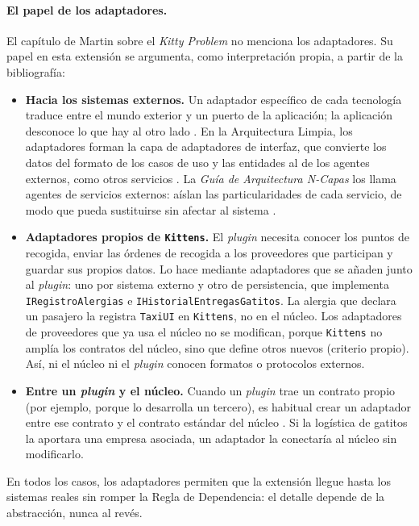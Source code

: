 \paragraph{El papel de los adaptadores.}
El capítulo de Martin sobre el \emph{Kitty Problem} no menciona los adaptadores. Su papel
en esta extensión se argumenta, como interpretación propia, a partir de la bibliografía:
\begin{itemize}
  \item \textbf{Hacia los sistemas externos.} Un adaptador específico de cada tecnología
        traduce entre el mundo exterior y un puerto de la aplicación; la aplicación
        desconoce lo que hay al otro lado \parencite[«Intent»]{cockburn2005}. En la
        Arquitectura Limpia, los adaptadores forman la capa de adaptadores de interfaz, que
        convierte los datos del formato de los casos de uso y las entidades al de los
        agentes externos, como otros servicios
        \parencite[205]{martin2017}. La \emph{Guía de Arquitectura N-Capas} los llama
        agentes de servicios externos: aíslan las particularidades de cada servicio, de
        modo que pueda sustituirse sin afectar al sistema
        \parencite[58, 108]{delatorre2010}.
  \item \textbf{Adaptadores propios de \texttt{Kittens}.} El \emph{plugin} necesita
        conocer los puntos de recogida, enviar las órdenes de recogida a los proveedores
        que participan y guardar sus propios datos. Lo hace mediante adaptadores que se
        añaden junto al \emph{plugin}: uno por sistema externo y otro de persistencia, que
        implementa \texttt{IRegistroAlergias} e \texttt{IHistorialEntregasGatitos}. La
        alergia que declara un pasajero la registra \texttt{TaxiUI} en \texttt{Kittens},
        no en el núcleo. Los adaptadores de proveedores que ya usa el núcleo no se
        modifican, porque \texttt{Kittens} no amplía los contratos del núcleo, sino que
        define otros nuevos (criterio propio). Así, ni el núcleo ni el \emph{plugin} conocen formatos o
        protocolos externos.
  \item \textbf{Entre un \emph{plugin} y el núcleo.} Cuando un \emph{plugin} trae un
        contrato propio (por ejemplo, porque lo desarrolla un tercero), es habitual crear
        un adaptador entre ese contrato y el contrato estándar del núcleo
        \parencite[23]{richards2015}. Si la logística de gatitos la aportara una empresa
        asociada, un adaptador la conectaría al núcleo sin modificarlo.
\end{itemize}
En todos los casos, los adaptadores permiten que la extensión llegue hasta los sistemas
reales sin romper la Regla de Dependencia: el detalle depende de la abstracción, nunca al
revés.

